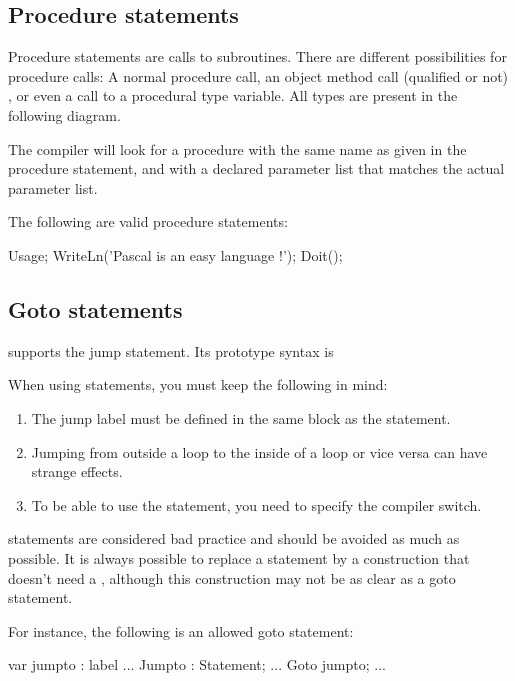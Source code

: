 \documentclass{report}
\begin{document}
\subsection{Procedure statements}

Procedure statements are calls to subroutines. There are
different possibilities for procedure calls: A normal procedure call, an
object method call (qualified or not) , or even a call to a procedural 
type variable. All types are present in the following diagram.



The \fpc compiler will look for a procedure with the same name as given in
the procedure statement, and with a declared parameter list that matches the
actual parameter list.

The following are valid procedure statements:
\begin{listing}
Usage;
WriteLn('Pascal is an easy language !');  
Doit();
\end{listing}

\subsection{Goto statements}

\fpc supports the  jump statement. Its prototype syntax is



When using  statements, you must keep the following in mind:
\begin{enumerate}
\item The jump label must be defined in the same block as the 
statement.
\item Jumping from outside a loop to the inside of a loop or vice versa can
 have strange effects.
\item To be able to use the  statement, you need to specify the 
 compiler switch.
\end{enumerate}
 statements are considered bad practice and should be avoided as
much as possible. It is always possible to replace a  statement by a
construction that doesn't need a , although this construction may 
not be as clear as a goto statement.

For instance, the following is an allowed goto statement:
\begin{listing}

var
  jumpto : label
...
Jumpto : 
  Statement;
...
Goto jumpto;
...
\end{listing}
\end{document}
